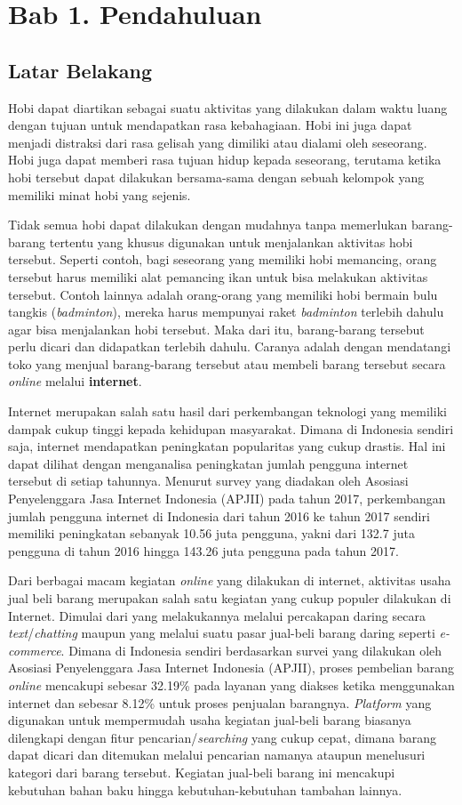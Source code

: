 \documentclass[a4paper]{article}
\newcommand{\bab}[1]{%
    \addtocounter{section}{1}%
    \setcounter{subsection}{0}
    \setcounter{subsubsection}{0}
    \setcounter{figure}{0}
    \setcounter{table}{0}
    \section*{#1}%
    \addcontentsline{toc}{section}{\protect\numberline{}#1}%
}
\newcommand{\subbab}[1]{%
    \subsection{#1}%
    \setcounter{figure}{0}
    \setcounter{table}{0}
}
\begin{document}
\newpage
{}
\bab{Bab 1. Pendahuluan}

\subbab{Latar Belakang}

Hobi dapat diartikan sebagai suatu aktivitas yang dilakukan dalam waktu luang dengan tujuan untuk mendapatkan rasa kebahagiaan. Hobi ini juga dapat menjadi distraksi dari rasa gelisah yang dimiliki atau dialami oleh seseorang. Hobi juga dapat memberi rasa tujuan hidup kepada seseorang, terutama ketika hobi tersebut dapat dilakukan bersama-sama dengan sebuah kelompok yang memiliki minat hobi yang sejenis\autocite{zaidi2022passion}.

Tidak semua hobi dapat dilakukan dengan mudahnya tanpa memerlukan barang-barang tertentu yang khusus digunakan untuk menjalankan aktivitas hobi tersebut. Seperti contoh, bagi seseorang yang memiliki hobi memancing, orang tersebut harus memiliki alat pemancing ikan untuk bisa melakukan aktivitas tersebut. Contoh lainnya adalah orang-orang yang memiliki hobi bermain bulu tangkis (\textit{badminton}), mereka harus mempunyai raket \textit{badminton} terlebih dahulu agar bisa menjalankan hobi tersebut. Maka dari itu, barang-barang tersebut perlu dicari dan didapatkan terlebih dahulu. Caranya adalah dengan mendatangi toko yang menjual barang-barang tersebut atau membeli barang tersebut secara \textit{online} melalui \textbf{internet}.

Internet merupakan salah satu hasil dari perkembangan teknologi yang memiliki dampak cukup tinggi kepada kehidupan masyarakat. Dimana di Indonesia sendiri saja, internet mendapatkan peningkatan popularitas yang cukup drastis. Hal ini dapat dilihat dengan menganalisa peningkatan jumlah pengguna internet tersebut di setiap tahunnya. Menurut survey yang diadakan oleh Asosiasi Penyelenggara Jasa Internet Indonesia (APJII) pada tahun 2017, perkembangan jumlah pengguna internet di Indonesia dari tahun 2016 ke tahun 2017 sendiri memiliki peningkatan sebanyak 10.56 juta pengguna, yakni dari 132.7 juta pengguna di tahun 2016 hingga 143.26 juta pengguna pada tahun 2017\autocite{indonesia2017infografis}.

Dari berbagai macam kegiatan \textit{online} yang dilakukan di internet, aktivitas usaha jual beli barang merupakan salah satu kegiatan yang cukup populer dilakukan di Internet. Dimulai dari yang melakukannya melalui percakapan daring secara \textit{text}/\textit{chatting} maupun yang melalui suatu pasar jual-beli barang daring seperti \textit{e-commerce}. Dimana di Indonesia sendiri berdasarkan survei yang dilakukan oleh Asosiasi Penyelenggara Jasa Internet Indonesia (APJII), proses pembelian barang \textit{online} mencakupi sebesar 32.19\% pada layanan yang diakses ketika menggunakan internet dan sebesar 8.12\% untuk proses penjualan barangnya\autocite{indonesia2017infografis}. \textit{Platform} yang digunakan untuk mempermudah usaha kegiatan jual-beli barang biasanya dilengkapi dengan fitur pencarian/\textit{searching} yang cukup cepat, dimana barang dapat dicari dan ditemukan melalui pencarian namanya ataupun menelusuri kategori dari barang tersebut. Kegiatan jual-beli barang ini mencakupi kebutuhan bahan baku hingga kebutuhan-kebutuhan tambahan lainnya.
\end{document}
